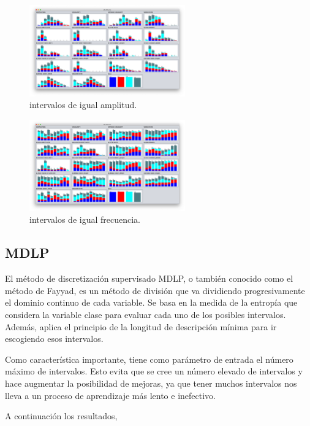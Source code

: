 \documentclass{article}
\begin{document}
\begin{figure}[h]
	\centering
	\includegraphics[width=0.6\textwidth]{igual_amplitud.png}
	\caption{intervalos de igual amplitud.}
	\label{fig:igual_amplitud}
\end{figure}

\begin{figure}[h]
	\centering
	\includegraphics[width=0.6\textwidth]{igual_frecuencia.png}
	\caption{intervalos de igual frecuencia.}
	\label{fig:igual_frecuencia}
\end{figure}

\subsection*{MDLP}

El método de discretización supervisado MDLP, o también conocido como el método de Fayyad, es un método de división que va dividiendo progresivamente el dominio continuo de cada variable. Se basa en la medida de la entropía que considera la variable clase para evaluar cada uno de los posibles intervalos. Además, aplica el principio de la longitud de descripción mínima para ir escogiendo esos intervalos.

Como característica importante, tiene como parámetro de entrada el número máximo de intervalos. Esto evita que se cree un número elevado de intervalos y hace augmentar la posibilidad de mejoras, ya que tener muchos intervalos nos lleva a un proceso de aprendizaje más lento e inefectivo.

A continuación los resultados,
\end{document}

